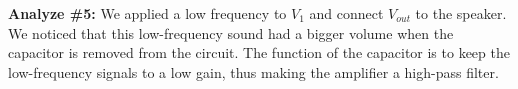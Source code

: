 \textbf{Analyze \#5:} \newline
\phantom{ } We applied a low frequency to $ V_1 $ and connect $ V_{out} $ to the speaker. We noticed that this low-frequency sound had a bigger volume when the capacitor is removed from the circuit. The function of the capacitor is to keep the low-frequency signals to a low gain, thus making the amplifier a high-pass filter.
